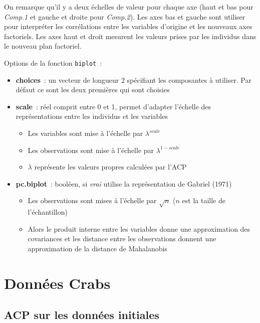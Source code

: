 \documentclass[a4paper,11pt]{report}
\begin{document}
On remarque qu'il y a deux échelles de valeur pour chaque axe (haut et bas pour \textit{Comp.1} et gauche et droite pour \textit{Comp.2}). Les axes bas et gauche sont utiliser pour interpréter les corrélations entre les variables d'origine et les nouveaux axes factoriels. Les axes haut et droit mesurent les valeurs prises par les individus dans le nouveau plan factoriel.

Options de la fonction \texttt{biplot}~:
\begin{itemize}
	\item \textbf{choices}~: un vecteur de longueur 2 spécifiant les composantes à utiliser. Par défaut ce sont les deux premières qui sont choisies
	
	\item \textbf{scale}~: réel comprit entre 0 et 1, permet d'adapter l'échelle des représentations entre les individus et les variables
	\begin{itemize}
		\item Les variables sont mise à l'échelle par $\lambda^{scale}$
		\item Les observations sont mise à l'échelle par $\lambda^{1-scale}$
		\item $\lambda$ représente les valeurs propres calculées par l'ACP
	\end{itemize}

	\item \textbf{pc.biplot}~: booléen, si \textit{vrai} utilise la représentation de Gabriel (1971)
	\begin{itemize}
		\item Les observations sont mises à l'échelle par $\sqrt{n}$ ($n$ est la taille de l'échantillon)
		\item Alors le produit interne entre les variables donne une approximation des covariances et les distance entre les observations donnent une approximation de la distance de Mahalanobis
	\end{itemize}
\end{itemize}

\section{Données Crabs}
\label{sec:2_3_ACP_Crabs}

\subsection{ACP sur les données initiales}
\end{document}
